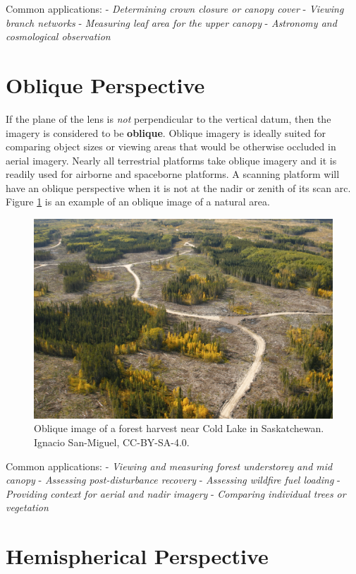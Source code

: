 \documentclass[
]{book}
\begin{document}
Common applications:
- \emph{Determining crown closure or canopy cover}
- \emph{Viewing branch networks}
- \emph{Measuring leaf area for the upper canopy}
- \emph{Astronomy and cosmological observation}

\hypertarget{oblique-perspective}{%
\section{Oblique Perspective}\label{oblique-perspective}}

If the plane of the lens is \emph{not} perpendicular to the vertical datum, then the imagery is considered to be \textbf{oblique}. Oblique imagery is ideally suited for comparing object sizes or viewing areas that would be otherwise occluded in aerial imagery. Nearly all terrestrial platforms take oblique imagery and it is readily used for airborne and spaceborne platforms. A scanning platform will have an oblique perspective when it is not at the nadir or zenith of its scan arc. Figure \ref{fig:12-oblique-image} is an example of an oblique image of a natural area.

\begin{figure}
\includegraphics[width=0.9\linewidth]{images/12-oblique-image} \caption{Oblique image of a forest harvest near Cold Lake in Saskatchewan. Ignacio San-Miguel, CC-BY-SA-4.0.}\label{fig:12-oblique-image}
\end{figure}

Common applications:
- \emph{Viewing and measuring forest understorey and mid canopy}
- \emph{Assessing post-disturbance recovery}
- \emph{Assessing wildfire fuel loading}
- \emph{Providing context for aerial and nadir imagery}
- \emph{Comparing individual trees or vegetation}

\hypertarget{hemispherical-perspective}{%
\section{Hemispherical Perspective}\label{hemispherical-perspective}}
\end{document}

